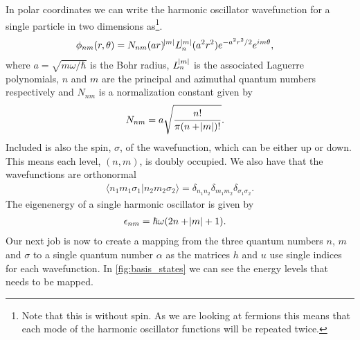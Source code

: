 \documentclass[
    a4paper, aps, twocolumn, floatfix, superscriptaddress,
    nofootinbib]{revtex4-1}
\newcommand{\1}{\mathds{1}}
\newcommand{\braket}[2]{\langle #1 \vert #2 \rangle}
\begin{document}
            In polar coordinates we can write the harmonic oscillator
            wavefunction for a single particle in two dimensions
            as\footnote{Note that this is without spin. As we are looking at
            fermions this means that each mode of the harmonic oscillator
            functions will be repeated twice.}.
            \begin{align}
                \phi_{nm}(r, \theta)
                &=
                N_{nm}
                (ar)^{\abs{m}}L_n^{\abs{m}}(a^2 r^2)e^{-a^2 r^2/2}
                e^{im\theta},
            \end{align}
            where $a = \sqrt{m\omega/\hbar}$ is the Bohr radius, $L_n^{\abs{m}}$
            is the associated Laguerre polynomials, $n$ and $m$ are the
            principal and azimuthal quantum numbers respectively and $N_{nm}$ is
            a normalization constant given by
            \begin{align}
                N_{nm}
                &= a\sqrt{\frac{n!}{\pi(n + \abs{m})!}}.
            \end{align}
            Included is also the spin, $\sigma$, of the wavefunction, which can
            be either up or down. This means each level, $(n, m)$, is doubly
            occupied. We also have that the wavefunctions are orthonormal
            \begin{align}
                \braket{n_1m_1\sigma_1}{n_2m_2\sigma_2}
                = \delta_{n_1n_2}\delta_{m_1m_2}\delta_{\sigma_1\sigma_2}.
            \end{align}
            The eigenenergy of a single harmonic oscillator is given by
            \begin{align}
                \epsilon_{nm} &= \hbar\omega(2n + \abs{m} + 1).
            \end{align}
            Our next job is now to create a mapping from the three quantum
            numbers $n$, $m$ and $\sigma$ to a single quantum number $\alpha$ as
            the matrices $h$ and $u$ use single indices for each wavefunction.
            In \autoref{fig:basis_states} we can see the energy levels that
            needs to be mapped.
\end{document}
